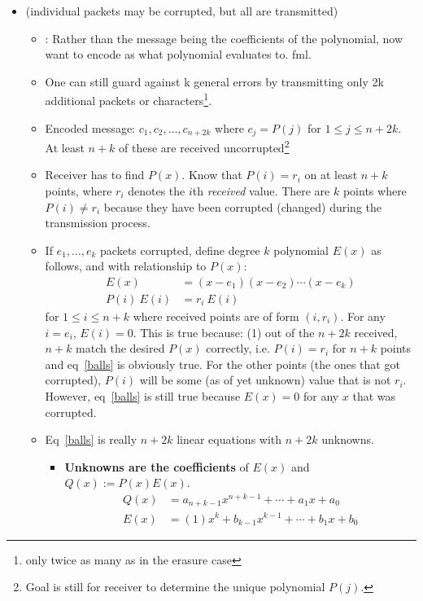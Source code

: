 \documentclass[12pt]{article}
\begin{document}
\begin{itemize}
	\item {} (individual packets may be corrupted, but all are transmitted)
	\begin{itemize}
		\item \textbf{}: Rather than the message being the coefficients of the polynomial, now want to encode as what polynomial evaluates to. fml. 
		\item One can still guard against k general errors by transmitting only 2k additional packets or characters\footnote{only twice as many as in the erasure case}.
		\item Encoded message: $c_1, c_2, \ldots, c_{n+2k}$ where $c_j = P(j)$ for $1 \le j \le n+2k$. At least $n+k$ of these are received uncorrupted\footnote{Goal is still for receiver to determine the unique polynomial $P(j)$.}
		\item Receiver has to find $P(x)$. Know that $P(i) = r_i$ on at least $n+k$ points, where $r_i$ denotes the $i$th \textit{received} value. There are $k$ points where $P(i) \ne r_i$ because they have been corrupted (changed) during the transmission process. 
		\item If $e_1, \ldots, e_k$ packets corrupted, define degree $k$ polynomial $E(x)$ as follows, and with relationship to $P(x)$:
		\begin{align}
			E(x) &= (x - e_1)(x-e_2)\cdots(x-e_k) \\
			P(i)~E(i) &= r_i ~ E(i) \label{balls}
		\end{align}
		for $1 \le i \le n+k$ where received points are of form $(i, r_i)$. For any $i = e_i$, $E(i) = 0$. This is true because: (1) out of the $n+2k$ received, $n+k$ match the desired $P(x)$ correctly, i.e. $P(i) = r_i$ for $n + k$ points and eq~\ref{balls} is obviously true. For the other points (the ones that got corrupted), $P(i)$ will be some (as of yet unknown) value that is not $r_i$. However, eq~\ref{balls} is still true because $E(x) = 0$ for any $x$ that was corrupted. 
		
		\item Eq~\ref{balls} is really $n+2k$ linear equations with $n+2k$ unknowns. 
		\begin{itemize}
			\item \blue\textbf{Unknowns are the coefficients} of $E(x)$ and $Q(x) := P(x)E(x)$. 
			\begin{align}
				Q(x) &= a_{n+k-1} x^{n+k-1} + \cdots + a_1 x + a_0 \\
				E(x) &= (1) x^k + b_{k-1} x^{k-1} + \cdots + b_1 x + b_0
			\end{align}
		\end{itemize}
		

\end{itemize}
\end{itemize}
\end{document}
